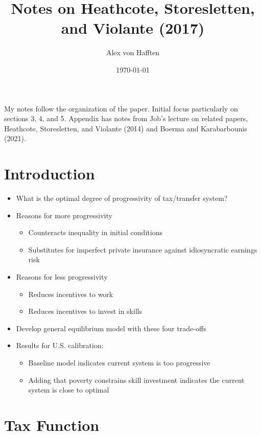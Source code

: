 \documentclass{article}
\title{Notes on Heathcote, Storesletten, and Violante (2017)}
\author{Alex von Hafften}
\date{\today}
\begin{document}
\maketitle

My notes follow the organization of the paper. Initial focus particularly on sections 3, 4, and 5. Appendix has notes from Job's lecture on related papers, Heathcote, Storesletten, and Violante (2014) and Boerma and Karabarbounis (2021).



\section{Introduction}



\begin{itemize}
\item What is the optimal degree of progressivity of tax/transfer system?
\item Reasons for more progressivity
\begin{itemize}
\item Counteracts inequality in initial conditions
\item Substitutes for imperfect private insurance against idiosyncratic earnings risk
\end{itemize}
\item Reasons for less progressivity
\begin{itemize}
\item Reduces incentives to work
\item Reduces incentives to invest in skills
\end{itemize}
\item Develop general equilibrium model with these four trade-offs
\item Results for U.S. calibration:
\begin{itemize}
\item Baseline model indicates current system is too progressive
\item Adding that poverty constrains skill investment indicates the current system is close to optimal
\end{itemize}
\end{itemize}



\section{Tax Function}
\end{document}
